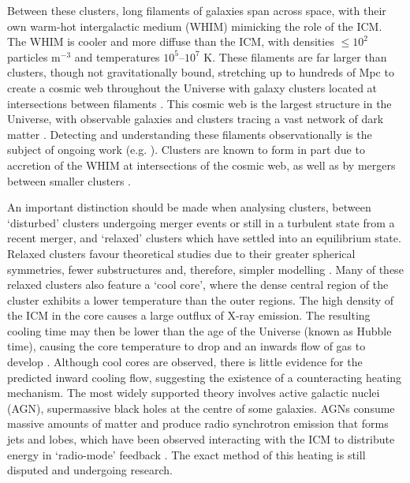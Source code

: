 Between these clusters, long filaments of galaxies span across space, with their own warm-hot intergalactic medium (WHIM) mimicking the role of the ICM. The WHIM is cooler and more diffuse than the ICM, with densities $\leq 10^2$ particles m$^{-3}$ and temperatures $10^5$--$10^7$ K. These filaments are far larger than clusters, though not gravitationally bound, stretching up to hundreds of Mpc to create a cosmic web throughout the Universe with galaxy clusters located at intersections between filaments \citep{Bohringer2025}. This cosmic web is the largest structure in the Universe, with observable galaxies and clusters tracing a vast network of dark matter \citep{Bond1996,Pimbblet2005}. Detecting and understanding these filaments observationally is the subject of ongoing work (e.g. \citealp{Tudorache2025}). Clusters are known to form in part due to accretion of the WHIM at intersections of the cosmic web, as well as by mergers between smaller clusters \citep{Press1974, Voit2005, Kravtsov2012}. 

An important distinction should be made when analysing clusters, between `disturbed' clusters undergoing merger events or still in a turbulent state from a recent merger, and `relaxed' clusters which have settled into an equilibrium state. Relaxed clusters favour theoretical studies due to their greater spherical symmetries, fewer substructures and, therefore, simpler modelling \citep{Mantz2016}. Many of these relaxed clusters also feature a `cool core', where the dense central region of the cluster exhibits a lower temperature than the outer regions. The high density of the ICM in the core causes a large outflux of X-ray emission. The resulting cooling time may then be lower than the age of the Universe (known as Hubble time), causing the core temperature to drop and an inwards flow of gas to develop \citep{Peterson2006,Hudson2010}. Although cool cores are observed, there is little evidence for the predicted inward cooling flow, suggesting the existence of a counteracting heating mechanism. The most widely supported theory involves active galactic nuclei (AGN), supermassive black holes at the centre of some galaxies. AGNs consume massive amounts of matter and produce radio synchrotron emission that forms jets and lobes, which have been observed interacting with the ICM to distribute energy in `radio-mode' feedback \citep{Fabian2012}. The exact method of this heating is still disputed and undergoing research.

